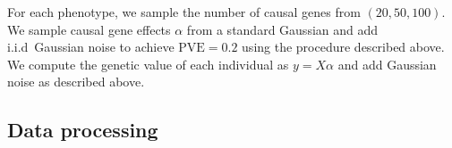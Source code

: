 \documentclass{article}
\begin{document}
For each phenotype, we sample the number of causal genes from $(20, 50, 100)$.
We sample causal gene effects $\alpha$ from a standard Gaussian and add
i.i.d\ Gaussian noise to achieve $\text{PVE} = 0.2$ using the procedure
described above. We compute the genetic value of each individual as $y = X
\alpha$ and add Gaussian noise as described above.

\subsection{Data processing}

\end{document}
